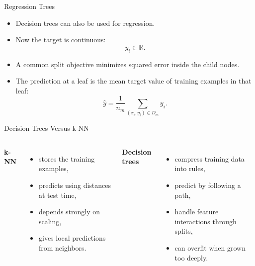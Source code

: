 \begin{frame}{Regression Trees}
\begin{itemize}
  \item Decision trees can also be used for regression.
  \pause
  \item Now the target is continuous:
  \[
    y_i \in \mathbb{R}.
  \]
  \pause
  \item A common split objective minimizes squared error inside the child nodes.
  \pause
  \item The prediction at a leaf is the mean target value of training examples in that leaf:
  \begin{equation}
    \hat{y}
    =
    \frac{1}{n_m}\sum_{(x_i,y_i)\in D_m} y_i.
    \label{eq:regression-tree-leaf-mean}
  \end{equation}
\end{itemize}
\end{frame}

\begin{frame}{Decision Trees Versus k-NN}
\begin{columns}[T]
\textbf{k-NN}
\begin{itemize}
  \item stores the training examples,
  \pause
  \item predicts using distances at test time,
  \pause
  \item depends strongly on scaling,
  \pause
  \item gives local predictions from neighbors.
\end{itemize}

\pause
{}
\textbf{Decision trees}
\begin{itemize}
  \item compress training data into rules,
  \pause
  \item predict by following a path,
  \pause
  \item handle feature interactions through splits,
  \pause
  \item can overfit when grown too deeply.
\end{itemize}
\end{columns}
\end{frame}

